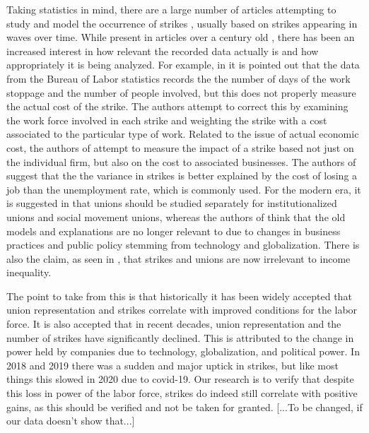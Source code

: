 \documentclass[reqno,11pt]{amsart}
\begin{document}
Taking statistics in mind, there are a large number of articles attempting
to study and model the occurrence of strikes \cite{Kennan, Kennan2, Mauro, Naples}, 
usually based on strikes appearing in waves over time. While present 
in articles over a century old \cite{Cross},
there has been an increased interest in
how relevant the recorded data actually is and how appropriately it is being
analyzed. For example,
in \cite{PalombaPalomba} it is pointed out that the data
from the Bureau of Labor statistics records the
the number of days of the work stoppage and the number of people involved,
but this does not properly measure the actual cost of the strike. The authors
attempt to correct this by examining the work force involved in each strike
and weighting the strike with a cost associated to the particular type of work.
Related to the issue of actual economic cost, the authors of \cite{Mchugh}
attempt to measure the impact of a strike based not just on the individual firm, 
but also on the cost to associated businesses.
The authors of \cite{SchorBowles} suggest that the the variance in strikes is better explained 
by the cost of losing a job than the unemployment rate, which is commonly used.
For the modern era, it is suggested in \cite{MartinDixon} that unions should be
studied separately for institutionalized unions and social movement unions,
whereas the authors of \cite{KeeranTarpinian} think that the old models
and explanations are no longer relevant to due to changes in business practices and public policy
stemming from technology and globalization. There is also the claim,
as seen in \cite{WallaceLeichtRaffalovich}, that strikes and unions are now irrelevant
to income inequality.


The point to take from this is that historically it has been widely accepted that
union representation and strikes correlate with improved conditions for the labor force. It is
also accepted that in recent decades, union representation and the number of strikes 
have significantly declined. This is attributed to the change in power held
by companies due to technology, globalization, and political power. In 2018 and 
2019 there was a sudden and major uptick in strikes, but like most things this
slowed in 2020 due to covid-19. Our research
is to verify that despite this loss in power of the labor force, strikes do indeed
still correlate with positive gains, as this should be verified and not be taken for granted.
[...To be changed, if our data doesn't show that...]
\end{document}

